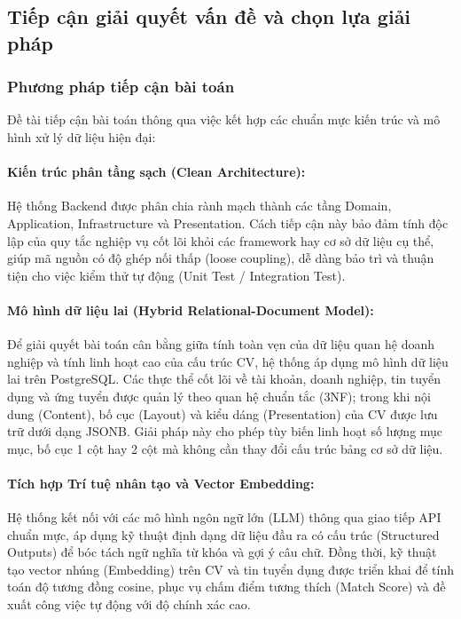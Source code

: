 \subsection{Tiếp cận giải quyết vấn đề và chọn lựa giải pháp}

\subsubsection{Phương pháp tiếp cận bài toán}
Đề tài tiếp cận bài toán thông qua việc kết hợp các chuẩn mực kiến trúc và mô hình xử lý dữ liệu hiện đại:

\paragraph{Kiến trúc phân tầng sạch (Clean Architecture):}
Hệ thống Backend được phân chia rành mạch thành các tầng Domain, Application, Infrastructure và Presentation. Cách tiếp cận này bảo đảm tính độc lập của quy tắc nghiệp vụ cốt lõi khỏi các framework hay cơ sở dữ liệu cụ thể, giúp mã nguồn có độ ghép nối thấp (loose coupling), dễ dàng bảo trì và thuận tiện cho việc kiểm thử tự động (Unit Test / Integration Test).

\paragraph{Mô hình dữ liệu lai (Hybrid Relational-Document Model):}
Để giải quyết bài toán cân bằng giữa tính toàn vẹn của dữ liệu quan hệ doanh nghiệp và tính linh hoạt cao của cấu trúc CV, hệ thống áp dụng mô hình dữ liệu lai trên PostgreSQL. Các thực thể cốt lõi về tài khoản, doanh nghiệp, tin tuyển dụng và ứng tuyển được quản lý theo quan hệ chuẩn tắc (3NF); trong khi nội dung (Content), bố cục (Layout) và kiểu dáng (Presentation) của CV được lưu trữ dưới dạng JSONB. Giải pháp này cho phép tùy biến linh hoạt số lượng mục mục, bố cục 1 cột hay 2 cột mà không cần thay đổi cấu trúc bảng cơ sở dữ liệu.

\paragraph{Tích hợp Trí tuệ nhân tạo và Vector Embedding:}
Hệ thống kết nối với các mô hình ngôn ngữ lớn (LLM) thông qua giao tiếp API chuẩn mực, áp dụng kỹ thuật định dạng dữ liệu đầu ra có cấu trúc (Structured Outputs) để bóc tách ngữ nghĩa từ khóa và gợi ý câu chữ. Đồng thời, kỹ thuật tạo vector nhúng (Embedding) trên CV và tin tuyển dụng được triển khai để tính toán độ tương đồng cosine, phục vụ chấm điểm tương thích (Match Score) và đề xuất công việc tự động với độ chính xác cao.

